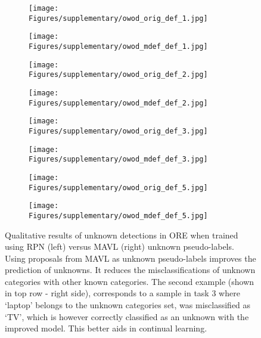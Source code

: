 \documentclass[runningheads]{llncs}
\begin{document}
\begin{figure*}[!h]
  \centering
    \begin{subfigure}{.24\columnwidth}
    \centering
    \texttt{[image: Figures/supplementary/owod\_orig\_def\_1.jpg]}
  \end{subfigure}\begin{subfigure}{.24\columnwidth}
    \centering
    \texttt{[image: Figures/supplementary/owod\_mdef\_def\_1.jpg]}
  \end{subfigure}
  \begin{subfigure}{.24\columnwidth}
    \centering
    \texttt{[image: Figures/supplementary/owod\_orig\_def\_2.jpg]}
  \end{subfigure}\begin{subfigure}{.24\columnwidth}
    \centering
    \texttt{[image: Figures/supplementary/owod\_mdef\_def\_2.jpg]}
  \end{subfigure}\hfill
  \begin{subfigure}{.24\columnwidth}
    \centering
    \texttt{[image: Figures/supplementary/owod\_orig\_def\_3.jpg]}
  \end{subfigure}\begin{subfigure}{.24\columnwidth}
    \centering
    \texttt{[image: Figures/supplementary/owod\_mdef\_def\_3.jpg]}
  \end{subfigure}\begin{subfigure}{.24\columnwidth}
    \centering
    \texttt{[image: Figures/supplementary/owod\_orig\_def\_5.jpg]}
  \end{subfigure}\begin{subfigure}{.24\columnwidth}
    \centering
    \texttt{[image: Figures/supplementary/owod\_mdef\_def\_5.jpg]}
  \end{subfigure}\caption{Qualitative  results  of  unknown  detections in ORE \cite{joseph2021towards} when trained using RPN (left) versus MAVL (right) unknown pseudo-labels. Using proposals from MAVL as unknown pseudo-labels improves the prediction of unknowns. It reduces the misclassifications of unknown categories with other known categories. The second example (shown in top row - right side), corresponds to a sample in task 3 where ‘laptop' belongs to the unknown categories set, was misclassified as ‘TV', which is however correctly classified as an unknown with the improved model. This better aids in continual learning.}
  \label{figure:owod}
\end{figure*}
\end{document}
